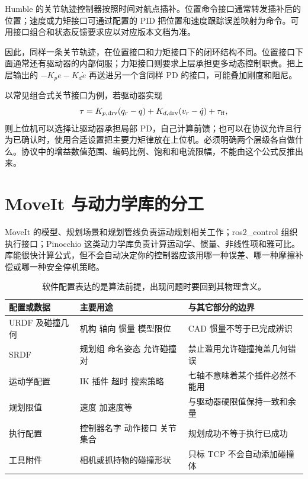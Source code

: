 Humble 的关节轨迹控制器按照时间对航点插补。位置命令接口通常转发插补后的位置；速度或力矩接口可通过配置的 PID 把位置和速度跟踪误差映射为命令。可用接口组合和状态反馈要求应以对应版本文档为准。\cite{jointtrajectory}

因此，同样一条关节轨迹，在位置接口和力矩接口下的闭环结构不同。位置接口下面通常还有驱动器的内部伺服；力矩接口则要求上层承担更多动态控制职责。把上层输出的 $-K_pe-K_d\dot e$ 再送进另一个含同样 PD 的接口，可能叠加刚度和阻尼。

以常见组合式关节接口为例，若驱动器实现
\begin{equation}
\tau=K_{p,\rm drv}(q_r-q)+K_{d,\rm drv}(v_r-\dot q)+\tau_{\rm ff},
\end{equation}
则上位机可以选择让驱动器承担局部 PD，自己计算前馈；也可以在协议允许且行为已确认时，使用合适设置把主要力矩律放在上位机。必须明确两个层级各自做什么。协议中的增益数值范围、编码比例、饱和和电流限幅，不能由这个公式反推出来。

\section{MoveIt 与动力学库的分工}

MoveIt 的模型、规划场景和规划管线负责运动规划相关工作；ros2\_control 组织执行接口；Pinocchio 这类动力学库负责计算运动学、惯量、非线性项和雅可比。库能很快计算公式，但不会自动决定你的控制器应该用哪一种误差、哪一种摩擦补偿或哪一种安全停机策略。

\begin{table}[htbp]\centering\small
\begin{tabularx}{\linewidth}{p{34mm}XX}\toprule
配置或数据 & 主要用途 & 与其它部分的边界\\\midrule
URDF 及碰撞几何 & 机构 轴向 惯量 模型限位 & CAD 惯量不等于已完成辨识\\
SRDF & 规划组 命名姿态 允许碰撞对 & 禁止滥用允许碰撞掩盖几何错误\\
运动学配置 & IK 插件 超时 搜索策略 & 七轴不意味着某个插件必然不能用\\
规划限值 & 速度 加速度等 & 与驱动器硬限值保持一致和余量\\
执行配置 & 控制器名字 动作接口 关节集合 & 规划成功不等于执行已成功\\
工具附件 & 相机或抓持物的碰撞形状 & 只标 TCP 不会自动添加碰撞体\\\bottomrule
\end{tabularx}
\caption{软件配置表达的是算法前提，出现问题时要回到其物理含义。}
\end{table}

